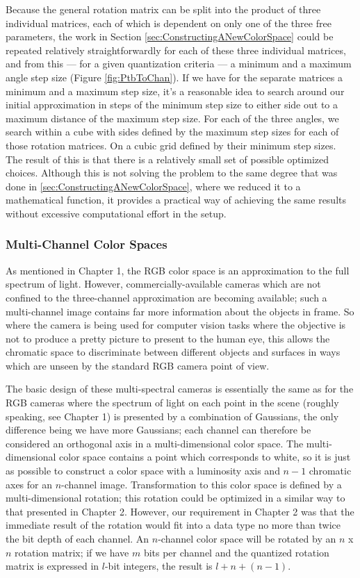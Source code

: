 Because the general rotation matrix can be split into the product of three individual matrices, each of which is dependent on only one of the three free parameters, the work in Section \ref{sec:ConstructingANewColorSpace} could be repeated relatively straightforwardly for each of these three individual matrices, and from this --- for a given quantization criteria --- a minimum and a maximum angle step size (Figure \ref{fig:PtbToChan}). If we have for the separate matrices a minimum and a maximum step size, it's a reasonable idea to search around our initial approximation in steps of the minimum step size to either side out to a maximum distance of the maximum step size. For each of the three angles, we search within a cube with sides defined by the maximum step sizes for each of those rotation matrices. On a cubic grid defined by their minimum step sizes. The result of this is that there is a relatively small set of possible optimized choices. Although this is not solving the problem to the same degree that was done in \ref{sec:ConstructingANewColorSpace}, where we reduced it to a mathematical function, it provides a practical way of achieving the same results without excessive computational effort in the setup. 

\subsubsection{Multi-Channel Color Spaces}\label{sec:MultiChannelColorSpaces}

As mentioned in Chapter 1, the RGB color space is an approximation to the full spectrum of light. However, commercially-available cameras which are not confined to the three-channel approximation are becoming available; such a multi-channel image contains far more information about the objects in frame. So where the camera is being used for computer vision tasks where the objective is not to produce a pretty picture to present to the human eye, this allows the chromatic space to discriminate between different objects and surfaces in ways which are unseen by the standard RGB camera point of view.

The basic design of these multi-spectral cameras is essentially the same as for the RGB cameras where the spectrum of light on each point in the scene (roughly speaking, see Chapter 1) is presented by a combination of Gaussians, the only difference being we have more Gaussians; each channel can therefore be considered an orthogonal axis in a multi-dimensional color space. The multi-dimensional color space contains a point which corresponds to white, so it is just as possible to construct a color space with a luminosity axis and $n-1$ chromatic axes for an $n$-channel image. Transformation to this color space is defined by a multi-dimensional rotation; this rotation could be optimized in a similar way to that presented in Chapter 2. However, our requirement in Chapter 2 was that the immediate result of the rotation would fit into a data type no more than twice the bit depth of each channel. An $n$-channel color space will be rotated by an $n$ x $n$ rotation matrix; if we have $m$ bits per channel and the quantized rotation matrix is expressed in $l$-bit integers, the result is $l + n + (n-1)$.

